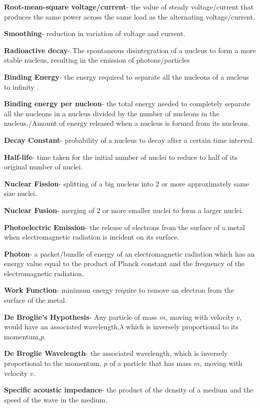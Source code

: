 \documentclass{article}
\begin{document}
\begin{flushleft}
 \textbf{Root-mean-square voltage/current}- the value of steady voltage/current that produces the same power across the same load as the alternating voltage/current.
 
 \textbf{Smoothing}- reduction in variation of voltage and current.
 
 \textbf{Radioactive decay}- The spontaneous disintegration of a nucleus to form a more stable nucleus, resulting in the emission of photons/particles
 
 \textbf{Binding Energy}- the energy required to separate all the nucleons of a nucleus to infinity .
 
 \textbf{Binding energy per nucleon}- the total energy needed to completely separate all the nucleons in a nucleus divided by the number of nucleons in the nucleus./Amount of energy released when a nucleus is formed from its nucleons.
 
 \textbf{Decay Constant}- probability of a nucleus to decay after a certain time interval.
 
 \textbf{Half-life}- time taken for the initial number of nuclei to reduce to half of its original number of nuclei.
 
 \textbf{Nuclear Fission}- splitting of a big nucleus into 2 or more approximately same size nuclei.
 
 \textbf{Nuclear Fusion}- merging of 2 or more smaller nuclei to form a larger nuclei.
 
 \textbf{Photoelectric Emission}- the release of electrons from the surface of a metal  when electromagnetic radiation is incident on its surface.
 
 \textbf{Photon}- a packet/bundle of energy of an electromagnetic radiation which has an energy value equal to the product of Planck constant and the frequency of the electromagnetic radiation.
 
 \textbf{Work Function}- minimum energy require to remove an electron from the surface of the metal.
 
 \textbf{De Broglie's Hypothesis}- Any particle of mass $m$, moving with velocity $v$, would have an associated wavelength,$\lambda$ which is inversely proportional to its momentum,$p$.
 
 \textbf{De Broglie Wavelength}- the associated wavelength, which is inversely proportional to the momentum, $p$ of a particle that has mass $m$, moving with velocity $v$.
 
 \textbf{Specific acoustic impedance}- the product of the density of a medium and the speed of the wave in the medium.
 

\end{flushleft}
\end{document}
